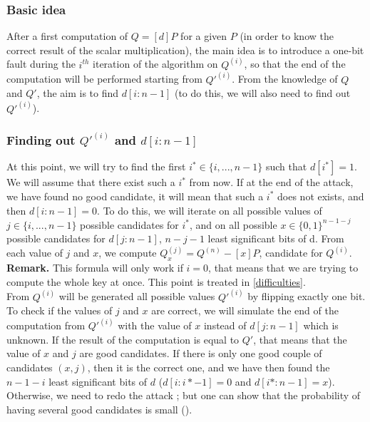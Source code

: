 \documentclass[journal]{IEEEtran}
\begin{document}
\subsubsection{Basic idea} 
After a first computation of $Q = [d]P$ for a given $P$ (in order to know the correct result of the scalar multiplication), the main idea 
is to introduce a one-bit fault during the $i^{th}$ iteration of the algorithm on $Q^{(i)}$, so that the end of the computation
will be performed starting from $Q'^{(i)}$. From the knowledge of $Q$ and $Q'$, the aim is to find $d[i:n-1]$ (to do this, we will also need 
to find out $Q'^{(i)}$).\\

\subsubsection{Finding out $Q'^{(i)}$ and $d[i:n-1]$}
At this point, we will try to find the first $i^* \in \{i, ..., n-1\}$ such that $d[i^*] = 1$. We will assume that there exist such a $i^*$ from now.
If at the end of the attack, we have found no good candidate, it will mean that such a $i^*$ does not exists, and then $d[i:n-1] = 0$.
To do this, we will iterate on all possible values of $j \in \{i, ..., n-1\}$ possible candidates for $i^*$, and on all possible $x \in \{0, 1\}^{n-1-j}$ 
possible candidates for $d[j:n-1]$, $n - j - 1$ least significant bits of d.
From each value of $j$ and $x$, we compute $Q_x^{(j)} = Q^{(n)} - [x]P$, candidate for $Q^{(i)}$. \\

\label{rq}
{\bf Remark.} This formula will only work if $i = 0$, that means that we are trying to compute the whole key at once. This point is treated in \ref{difficulties}.\\


From $Q^{(i)}$ will be generated all possible values $Q'^{(i)}$ by flipping exactly one bit. To check if the values of $j$ and $x$ are correct, 
we will simulate the end of the computation from $Q'^{(i)}$ with the value of $x$ instead of $d[j:n-1]$ which is unknown. If the result of the computation
is equal to $Q'$, that means that the value of $x$ and $j$ are good candidates.
If there is only one good couple of candidates $(x, j)$, then it is the correct one, and we have then found the $n - 1 - i$ least significant bits of $d$ ($d[i:i*-1] = 0$ and $d[i*:n-1] = x$).
Otherwise, we need to redo the attack ; but one can show that the probability of having several good candidates is small 
(\cite{biehl2000differential}).\\
\end{document}

